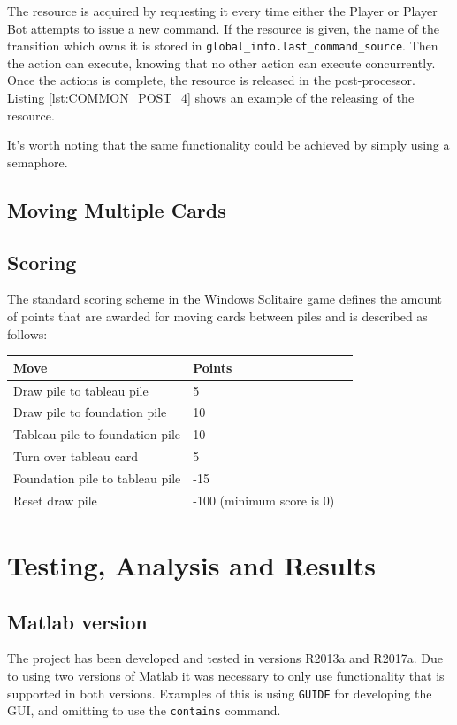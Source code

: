 \documentclass[runningheads,a4paper]{llncs}
\newcommand{\GPenSIM}{../GPenSIM}
\begin{document}
The resource is acquired by requesting it every time either the Player or Player Bot attempts to issue a new command. If the resource is given, the name of the transition which owns it is stored in \verb!global_info.last_command_source!. Then the action can execute, knowing that no other action can execute concurrently. Once the actions is complete, the resource is released in the post-processor. Listing \ref{lst:COMMON_POST_4} shows an example of the releasing of the resource.


It's worth noting that the same functionality could be achieved by simply using a semaphore.
\subsection{Moving Multiple Cards}
\subsection{Scoring}
The standard scoring scheme in the Windows Solitaire game defines the amount of points that are awarded for moving cards between piles and is described as follows:
\begin{center}
	\begin{tabular}{ | l | l | l | }
		\hline
		Move & Points \\ \hline
		Draw pile to tableau pile & 5  \\ \hline
		Draw pile to foundation pile & 10 \\ \hline
		Tableau pile to foundation pile & 10  \\ \hline
		Turn over tableau card & 5 \\ \hline
		Foundation pile to tableau pile & -15 \\ \hline
		Reset draw pile & -100 (minimum score is 0) \\ \hline
	\end{tabular}
\end{center}


\section{Testing, Analysis and Results}
\label{sec:4_testing_analysis}
\subsection{Matlab version}
The project has been developed and tested in versions R2013a and R2017a. Due to using two versions of Matlab it was necessary to only use functionality that is supported in both versions. Examples of this is using \verb!GUIDE! for developing the GUI, and omitting to use the \verb!contains! command.
\end{document}
